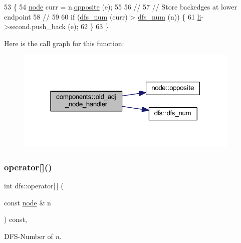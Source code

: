 \begin{DoxyCode}
53 \{
54     \mbox{\hyperlink{classnode}{node}} curr = n.\mbox{\hyperlink{classnode_a13dbd1809a33a5efede64a359e53a363}{opposite}} (e);
55 
56     \textcolor{comment}{//}
57     \textcolor{comment}{// Store backedges at lower endpoint}
58     \textcolor{comment}{//}
59 
60     \textcolor{keywordflow}{if} (\mbox{\hyperlink{classdfs_a315f16831a0bd333960e87e045cb37c8}{dfs\_num}} (curr) > \mbox{\hyperlink{classdfs_a315f16831a0bd333960e87e045cb37c8}{dfs\_num}} (n)) \{ 
61     \mbox{\hyperlink{classcomponents_ae88ffb062b1ea4931ecfaa53e871825f}{li}}->second.push\_back (e);    
62     \}
63 \}
\end{DoxyCode}
Here is the call graph for this function\+:\nopagebreak
\begin{figure}[H]
\begin{center}
\leavevmode
\includegraphics[width=303pt]{classcomponents_afcf7a0bee5104bba7986039a9d6bd1ee_cgraph}
\end{center}
\end{figure}
\mbox{\label{classdfs_a014b90894a47fa5abb7f4e5030be2c3e}} 
\subsubsection{\texorpdfstring{operator[]()}{operator[]()}}
{\footnotesize\ttfamily int dfs\+::operator\mbox{[}$\,$\mbox{]} (\begin{DoxyParamCaption}\item[{const \mbox{\hyperlink{classnode}{node}} \&}]{n }\end{DoxyParamCaption}) const\hspace{0.3cm}{\ttfamily [inline]}, {\ttfamily [inherited]}}



D\+F\+S-\/\+Number of {\itshape n}. 

